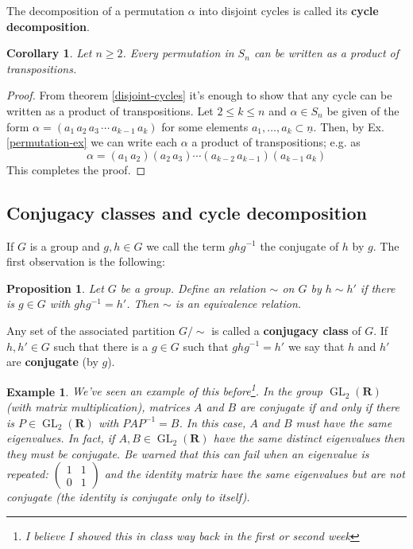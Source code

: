 \documentclass[12pt]{article}
\numberwithin{equation}{subsection}
\newtheorem{prop}[subsection]{Proposition}
\newtheorem{corollary}[subsection]{Corollary}
\theoremstyle{note}
\newtheorem{example}[subsection]{Example}
\newcommand{\GL}{\operatorname{GL}}
\begin{document}
The decomposition of a permutation $\alpha$ into disjoint cycles is called its \textbf{cycle decomposition}. 
\begin{corollary} \label{trans-generate-Sn}
	Let $n\geq 2$. Every permutation in $S_n$ can be written as a product of transpositions.
\end{corollary}
\begin{proof}
	From theorem \ref{disjoint-cycles} it's enough to show that any cycle can be written as a product of transpositions. Let $2\leq k\leq n$ and $\alpha \in S_n$ be given of the form $\alpha=(a_1\, a_2\, a_3\,\cdots \, a_{k-1}\, a_k)$ for some elements $a_1,\dots,a_k\subset \underline{n}$. Then, by Ex. \ref{permutation-ex} we can write each $\alpha$ a product of transpositions; e.g. as\[\alpha= (a_{1} \, a_2)(a_2\, a_3) \cdots (a_{k-2} \, a_{k-1} )(a_{k-1} \, a_k)\]This completes the proof.
\end{proof} 
\subsection{Conjugacy classes and cycle decomposition}

If $G$ is a group and $g,h\in G$ we call the term $ghg^{-1}$ the conjugate of $h$ by $g$. The first observation is the following:

\begin{prop}
	Let $G$ be a group. Define an relation $\sim$ on $G$ by $h\sim h'$ if there is $g\in G$ with $ghg^{-1}=h'$. Then $\sim$ is an equivalence relation.
\end{prop}

Any set of the associated partition $G/\sim$ is called a \textbf{conjugacy class} of $G$. If $h,h'\in G$ such that there is a $g\in G$ such that $ghg^{-1}=h'$ we say that $h$ and $h'$ are \textbf{conjugate} (by $g$). 

\begin{example}
	We've seen an example of this before\footnote{I believe I showed this in class way back in the first or second week}. In the group $\GL_2(\mathbf{R})$ (with matrix multiplication), matrices $A$ and $B$ are conjugate if and only if there is $P\in \GL_2(\mathbf{R})$ with $PAP^{-1}=B$. In this case, $A$ and $B$ must have the same eigenvalues. In fact, if $A,B\in \GL_2(\mathbf{R})$ have the same \textit{distinct} eigenvalues then they must be conjugate. Be warned that this can fail when an eigenvalue is repeated: $\begin{pmatrix} 1 & 1 \\ 0 & 1\end{pmatrix}$ and the identity matrix have the same eigenvalues but are not conjugate (the identity is conjugate only to itself). 

\end{example}
\end{document}
